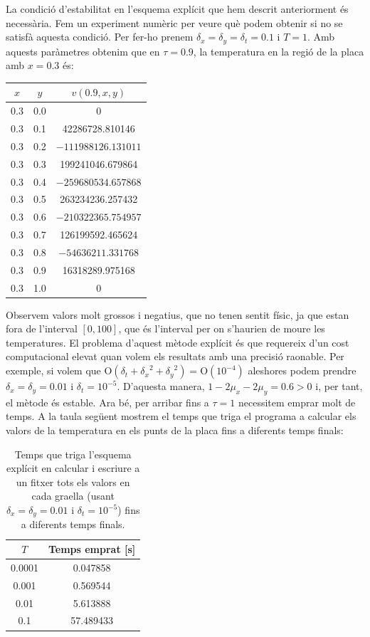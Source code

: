 \documentclass[10pt,a4paper]{article}
\renewcommand{\O}[1]{\mathrm{O}\left(#1\right)} %
\theoremstyle{definition}
\theoremstyle{remark}
\begin{document}
La condició d'estabilitat en l'esquema explícit que hem descrit anteriorment és necessària. Fem un experiment numèric per veure què podem obtenir si no se satisfà aquesta condició. Per fer-ho prenem $\delta_x=\delta_y=\delta_t=0.1$ i $T=1$. Amb aquests paràmetres obtenim que en $\tau=0.9$, la temperatura en la regió de la placa amb $x=0.3$ és:
\begin{table}[ht]
  \centering
  \begin{tabular}{|c|c|c|}
    \hline
    $x$ & $y$ & $v(0.9,x,y)$        \\ \hline\hline
    0.3 & 0.0 & 0                   \\
    0.3 & 0.1 & 42286728.810146     \\
    0.3 & 0.2 & $-111988126.131011$ \\
    0.3 & 0.3 & 199241046.679864    \\
    0.3 & 0.4 & $-259680534.657868$ \\
    0.3 & 0.5 & 263234236.257432    \\
    0.3 & 0.6 & $-210322365.754957$ \\
    0.3 & 0.7 & 126199592.465624    \\
    0.3 & 0.8 & $-54636211.331768$  \\
    0.3 & 0.9 & 16318289.975168     \\
    0.3 & 1.0 & 0                   \\
    \hline
  \end{tabular}
\end{table}

Observem valors molt grossos i negatius, que no tenen sentit físic, ja que estan fora de l'interval $[0,100]$, que és l'interval per on s'haurien de moure les temperatures. El problema d'aquest mètode explícit és que requereix d'un cost computacional elevat quan volem els resultats amb una precisió raonable. Per exemple, si volem que $\O{\delta_t + {\delta_x}^2 + {\delta_y}^2} = \O{10^{-4}}$ aleshores podem prendre $\delta_x= \delta_y=0.01$ i $\delta_t=10^{-5}$. D'aquesta manera, $1-2\mu_x-2\mu_y = 0.6>0$ i, per tant, el mètode és estable. Ara bé, per arribar fins a $\tau=1$ necessitem emprar molt de temps. A la taula següent mostrem el temps que triga el programa a calcular els valors de la temperatura en els punts de la placa fins a diferents temps finals:
\begin{table}[ht]
  \centering
  \begin{tabular}{|c|c|}
    \hline
    $T$    & Temps emprat [s] \\ \hline\hline
    0.0001 & 0.047858         \\
    0.001  & 0.569544         \\
    0.01   & 5.613888         \\
    0.1    & 57.489433        \\
    \hline
  \end{tabular}
  \caption{Temps que triga l'esquema explícit en calcular i escriure a un fitxer tots els valors en cada graella (usant $\delta_x= \delta_y=0.01$ i $\delta_t=10^{-5}$) fins a diferents temps finals.}
\end{table}
\end{document}
